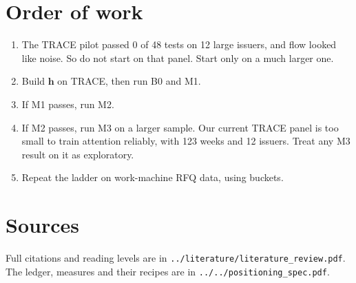 \documentclass[11pt]{article}
\begin{document}
\section{Order of work}
\begin{enumerate}
\item The TRACE pilot passed 0 of 48 tests on 12 large issuers, and flow looked like noise. So do not start on that panel. Start only on a much larger one.
\item Build $\mathbf{h}$ on TRACE, then run B0 and M1.
\item If M1 passes, run M2.
\item If M2 passes, run M3 on a larger sample. Our current TRACE panel is too small to train attention reliably, with 123 weeks and 12 issuers. Treat any M3 result on it as exploratory.
\item Repeat the ladder on work-machine RFQ data, using buckets.
\end{enumerate}

\section*{Sources}
Full citations and reading levels are in \texttt{../literature/literature\_review.pdf}. The ledger, measures and their recipes are in \texttt{../../positioning\_spec.pdf}.
\end{document}

